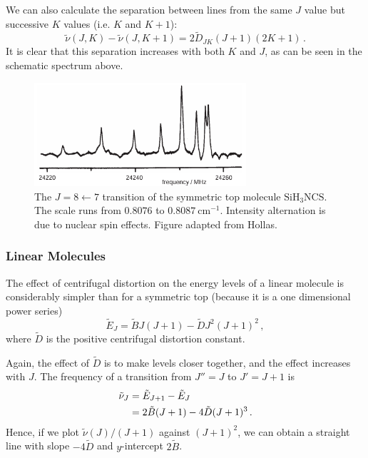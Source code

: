\documentclass{article}
\theoremstyle{plain}\theoremheaderfont{\normalfont\itshape}\theorembodyfont{\rmfamily}\theoremseparator{.}\newtheorem*{rem}{Remark}\newtheorem*{ex}{Example}\newtheorem*{proof}{Proof}\newtheorem*{altp}{Alternative proof}
\theoremstyle{plain}\theoremheaderfont{\normalfont\bfseries}\theorembodyfont{\rmfamily}\theoremseparator{.}\newtheorem{thm}{Theorem}[section]\newtheorem{lem}[thm]{Lemma}\newtheorem{prop}[thm]{Proposition}\newtheorem*{cor}{Corollary}\newtheorem{defn}[thm]{Definition}\newtheorem{clm}[thm]{Claim}\newtheorem{clminproof}{Claim}\newtheorem{pos}{Postulate}[section]
\theoremstyle{break}\theoremheaderfont{\normalfont\itshape}\theorembodyfont{\rmfamily}\theoremseparator{.\medskip}\newtheorem*{proofskip}{Proof}\newtheorem*{exs}{Examples}\newtheorem*{rems}{Remarks}
\theoremstyle{break}\theoremheaderfont{\normalfont\bfseries}\theorembodyfont{\rmfamily}\theoremseparator{.\medskip}\newtheorem{lemskip}[thm]{Lemma}\newtheorem{defnskip}[thm]{Definition}\newtheorem{propskip}[thm]{Proposition}\newtheorem{thmskip}[thm]{Theorem}
\numberwithin{equation}{section}
\newcommand{\unit}[1]{\ \mathrm{#1}}
\begin{document}
    We can also calculate the separation between lines from the same \(J\) value but successive \(K\) values (i.e. \(K\) and \(K+1\)):
    \begin{equation}
        \tilde{\nu}(J,K)-\tilde{\nu}(J,K+1)=2\tilde{D}_{JK}(J+1)(2K+1)\,.
    \end{equation}
    It is clear that this separation increases with both \(K\) and \(J\), as can be seen in the schematic spectrum above.

    \begin{figure}
        \centering
        \includegraphics[width=0.7\textwidth]{Centrifugal_distortion.png}
        \caption{The \(J=8\leftarrow 7\) transition of the symmetric top molecule \(\mathrm{SiH_3NCS}\). The scale runs from \(0.8076\) to \(0.8087\unit{cm}^{-1}\). Intensity alternation is due to nuclear spin effects. Figure adapted from Hollas.}
    \end{figure}

    \subsubsection{Linear Molecules}
    The effect of centrifugal distortion on the energy levels of a linear molecule is considerably simpler than for a symmetric top (because it is a one dimensional power series)
    \begin{equation}
        \tilde{E}_J=\tilde{B}J(J+1)-\tilde{D}J^2(J+1)^2\,,
    \end{equation}
    where \(\tilde{D}\) is the positive centrifugal distortion constant.

    Again, the effect of \(\tilde{D}\) is to make levels closer together, and the effect increases with \(J\). The frequency of a transition from \(J''=J\) to \(J'=J+1\) is
    \begin{align}
        \tilde{\nu}_J&=\tilde{E}_{J+1}-\tilde{E}_{J}\notag\\
        &=2\tilde{B}(J+1)-4\tilde{D}(J+1)^3\,.
    \end{align}
    Hence, if we plot \(\tilde{\nu}(J)/(J+1)\) against \((J+1)^2\), we can obtain a straight line with slope \(-4\tilde{D}\) and \(y\)-intercept \(2\tilde{B}\).
\end{document}
